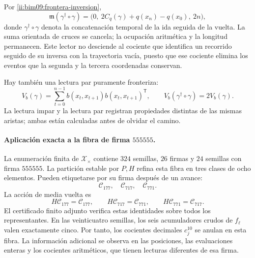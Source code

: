 Por \eqref{ii:bim09:frontera-inversion},
\begin{equation}
 \mathfrak m(\gamma^\dagger\circ\gamma)=
 \bigl(0,\ 2C_q(\gamma)+q(x_n)-q(x_0),\ 2n\bigr),
 \label{ii:bim09:memoria-retorno}
\end{equation}
donde $\gamma^\dagger\circ\gamma$ denota la concatenación temporal
de la ida seguida de la vuelta. La suma orientada de cruces se cancela;
la ocupación aritmética y la longitud permanecen. Este lector no
desciende al cociente que identifica un recorrido seguido de su inversa
con la trayectoria vacía, puesto que ese cociente elimina los eventos
que la segunda y la tercera coordenadas conservan.

Hay también una lectura par puramente fronteriza:
\[
 V_b(\gamma)=\sum_{t=0}^{n-1}
 b(x_t,x_{t+1})b(x_t,x_{t+1})^{\mathsf T},\qquad
 V_b(\gamma^\dagger\circ\gamma)=2V_b(\gamma).
\]
La lectura impar y la lectura par registran propiedades distintas de
las mismas aristas; ambas están calculadas antes de olvidar el camino.

\paragraph{Aplicación exacta a la fibra de firma \texorpdfstring{$555555$}{555555}.}

La enumeración finita de $\mathscr X_\times$ contiene $324$ semillas,
$26$ firmas y $24$ semillas con firma $555555$. La partición estable
por $P,H$ refina esta fibra en tres clases de ocho elementos. Pueden
etiquetarse por su firma después de un avance:
\[
 \mathscr C_{177},\quad\mathscr C_{717},\quad\mathscr C_{771}.
\]
La acción de media vuelta es
\[
 H\mathscr C_{177}=\mathscr C_{177},\qquad
 H\mathscr C_{717}=\mathscr C_{771},\qquad
 H\mathscr C_{771}=\mathscr C_{717}.
\]
El certificado finito adjunto verifica estas identidades sobre todos los
representantes. En las veinticuatro semillas, los seis acumuladores
crudos de $f_\ell$ valen exactamente cinco. Por tanto, los cocientes
decimales $c_j^{10}$ se anulan en esta fibra. La información adicional
se observa en las posiciones, las evaluaciones enteras y los cocientes
aritméticos, que tienen lecturas diferentes de esa firma.

